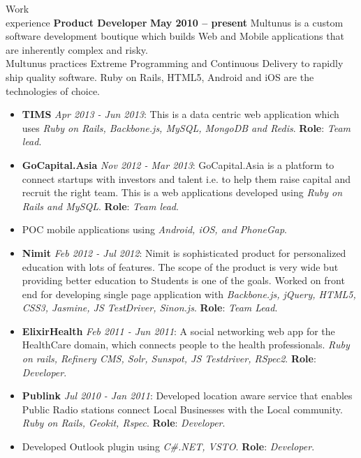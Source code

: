 \documentclass{resume}
\begin{document}
\begin{category}{Work \\experience}
  \citemnobullet \textbf{Product Developer} \hfill \textbf{May 2010 -- present}
  \citemnobullet Multunus is a custom software development boutique
  which builds Web and Mobile applications that are inherently
  complex and risky.\\Multunus practices Extreme Programming and Continuous
  Delivery to rapidly ship quality software. Ruby on Rails, HTML5, Android and iOS are the technologies of choice.
  \begin{itemize}
  \item \textbf{TIMS} {\em Apr 2013 - Jun 2013}: This is a data centric web application which uses {\em Ruby on Rails, Backbone.js, MySQL, MongoDB and Redis}. \textbf{Role}: {\em Team lead}. 
  \item \textbf{GoCapital.Asia} {\em Nov 2012 - Mar 2013}: GoCapital.Asia is a
    platform to connect startups with investors and talent i.e. to
    help them raise capital and recruit the right team. This is a web
    applications developed using {\em Ruby on Rails and MySQL}. \textbf{Role}:
    {\em Team lead}.
  \item POC mobile applications using {\em Android, iOS, and PhoneGap}.
  \item \textbf{Nimit} {\em Feb 2012 - Jul 2012}: Nimit is sophisticated
    product for personalized education with lots of features. The
    scope of the product is very wide but providing better education
    to Students is one of the goals. Worked on front end for
    developing single page application with {\em Backbone.js, jQuery,
      HTML5, CSS3, Jasmine, JS TestDriver, Sinon.js}. \textbf{Role}: {\em Team Lead}.
  \item \textbf{ElixirHealth} {\em Feb 2011 - Jun 2011}: A social networking web app for the HealthCare
    domain, which connects people to the health professionals. {\em
      Ruby on rails, Refinery CMS, Solr, Sunspot, JS Testdriver,
      RSpec2}. \textbf{Role}: {\em Developer}.
  \item \textbf{Publink} {\em Jul 2010 - Jan 2011}: Developed location aware service that enables Public Radio
    stations connect Local Businesses with the Local community. {\em Ruby on Rails, Geokit, Rspec}. \textbf{Role}: {\em Developer}.
  \item Developed Outlook plugin using {\em C\#.NET, VSTO}. \textbf{Role}: {\em Developer}.
  \end{itemize}

\end{category}
\end{document}
